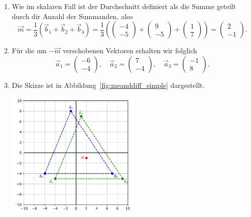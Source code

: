 \begin{losung}
	\begin{enumerate}[label=(\alph*)]
		\item Wie im skalaren Fall ist der Durchschnitt definiert als die Summe geteilt durch dir Anzahl der Summanden, also
		\begin{equation*}
			\vec{m}=\frac{1}{3}\left(\vec{b}_1+\vec{b}_2+\vec{b}_3\right)
			=\frac{1}{3}\left(
			\begin{pmatrix}
				-4 \\
				-5
			\end{pmatrix}+
			\begin{pmatrix}
				9 \\
				-5
			\end{pmatrix}+
			\begin{pmatrix}
				1 \\
				7
			\end{pmatrix}
			\right)
			=
			\begin{pmatrix}
				2 \\
				-1
			\end{pmatrix}.
		\end{equation*}
		\item Für die um $-\vec{m}$ verschobenen Vektoren erhalten wir folglich
		\begin{equation*}
			\vec{a}_1=
			\begin{pmatrix}
				-6 \\
				-4
			\end{pmatrix},\quad
			\vec{a}_2=
			\begin{pmatrix}
				7 \\
				-4
			\end{pmatrix},\quad
			\vec{a}_3=
			\begin{pmatrix}
				-1 \\
				8
			\end{pmatrix}.
		\end{equation*}
		\item Die Skizze ist in Abbildung~\ref{fig:meanddiff_simple} dargestellt.
			\begin{center}
			\includegraphics[width=0.5\textwidth]{images/facespace/meandiff_simple}
			\label{fig:meanddiff_simple}
			\end{center}
	\end{enumerate}
\end{losung}
